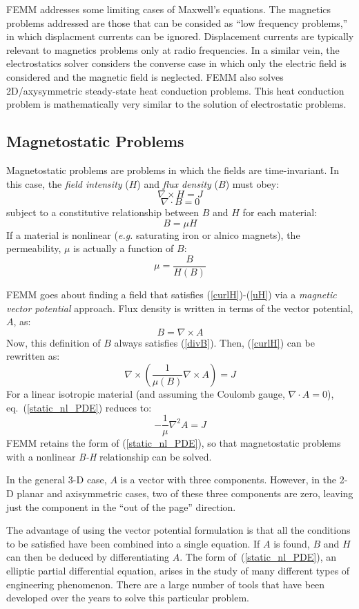 \documentclass[12pt]{report}
\newcommand{\be}{\begin{equation}}
\newcommand{\ee}{\end{equation}}
\newcommand{\Curl}{\nabla \times}
\newcommand{\Div}{\nabla \cdot}
\begin{document}
FEMM addresses some limiting cases of Maxwell's equations.  The
magnetics problems addressed are those that can be consided as
``low frequency problems,'' in which displacment currents can be
ignored. Displacement currents are typically relevant to magnetics
problems only at radio frequencies.  In a similar vein, the
electrostatics solver considers the converse case in which only the
electric field is considered and the magnetic field is neglected.
FEMM also solves 2D/axysymmetric steady-state heat conduction problems.
This heat conduction problem is mathematically very similar to the
solution of electrostatic problems.

\subsection{Magnetostatic Problems}

Magnetostatic problems are problems in which the fields are
time-invariant.  In this case, the {\em field intensity} ($H$) and
{\em flux density} ($B$) must obey:
\be \label{curlH} \Curl H = J \ee
\be \label{divB} \Div B = 0 \ee
subject to a constitutive relationship between $B$ and $H$ for each
material:
\be \label{uH} B= \mu H \ee
If a material is nonlinear ({\em e.g.} saturating iron or alnico
magnets), the permeability, $\mu$ is actually a function of $B$:
\be \mu= \frac{B}{H(B)} \ee

FEMM goes about finding a field that satisfies
(\ref{curlH})-(\ref{uH}) via a {\em magnetic vector potential}
approach. Flux density is written in terms of the vector potential,
$A$, as:
\be \label{defA} B = \Curl A \ee
Now, this definition of $B$ always satisfies (\ref{divB}).  Then,
(\ref{curlH}) can be rewritten as:
\be \label{static_nl_PDE} \nabla \times \left( \frac{1}{\mu(B)} \nabla \times A \right) = J \ee
For a linear isotropic material (and assuming the Coulomb gauge, $\nabla \cdot A =0$), eq.~(\ref{static_nl_PDE}) reduces to:
\be \label{static_lin_PDE} -\frac{1}{\mu} \nabla^2 A = J \ee
FEMM retains the form of (\ref{static_nl_PDE}), so that
magnetostatic problems with a nonlinear {\em B-H} relationship can
be solved.

In the general 3-D case, $A$ is a vector with three components.
However, in the 2-D planar and axisymmetric cases, two of these
three components are zero, leaving just the component in the ``out
of the page'' direction.

The advantage of using the vector potential formulation is that all
the conditions to be satisfied have been combined into a single
equation. If $A$ is found, $B$ and $H$ can then be deduced by
differentiating $A$. The form of~(\ref{static_nl_PDE}), an elliptic
partial differential equation, arises in the study of many
different types of engineering phenomenon. There are a large number
of tools that have been developed over the years to solve this
particular problem.
\end{document}
